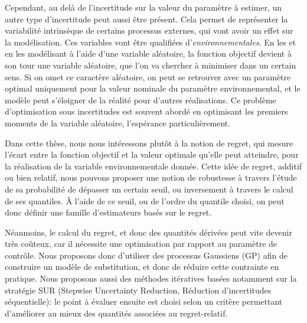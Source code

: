 Cependant, au delà de l'incertitude sur la valeur du paramètre à
estimer, un autre type d'incertitude peut aussi être présent. Cela
permet de représenter la variabilité intrinsèque de certains processus
externes, qui vont avoir un effet sur la modélisation. Ces variables
vont être qualifiées d'\emph{environnementales}. En les et en les
modélisant à l'aide d'une variable aléatoire, la fonction objectif
devient à son tour une variable aléatoire, que l'on va chercher à
minimiser dans un certain sens. Si on omet ce caractère aléatoire, on
peut se retrouver avec un paramètre optimal uniquement pour la valeur
nominale du paramètre environnemental, et le modèle peut s'éloigner de
la réalité pour d'autres réalisations. Ce problème d'optimisation sous
incertitudes est souvent abordé en optimisant les premiers moments de
la variable aléatoire, l'espérance particulièrement.

Dans cette thèse, nous nous intéressons plutôt à la notion de regret,
qui mesure l'écart entre la fonction objectif et la valeur optimale
qu'elle peut atteindre, pour la réalisation de la variable
environnementale donnée. Cette idée de regret, additif ou bien
relatif, nous pouvons proposer une notion de robustesse à travers
l'étude de sa probabilité de dépasser un certain seuil, ou inversement
à travers le calcul de ses quantiles. À l'aide de ce seuil, ou de
l'ordre du quantile choisi, on peut donc définir une famille
d'estimateurs basés sur le regret.

Néanmoins, le calcul du regret, et donc des quantités dérivées peut
vite devenir très coûteux, car il nécessite une optimisation par
rapport au paramètre de contrôle. Nous proposons donc d'utiliser des
processus Gaussiens (GP) afin de construire un modèle de substitution,
et donc de réduire cette contrainte en pratique. Nous proposons aussi
des méthodes itératives basées notamment sur la stratégie SUR
(Stepwise Uncertainty Reduction, Réduction d'incertitudes
séquentielle): le point à évaluer ensuite est choisi selon un critère
permettant d'améliorer au mieux des quantités associées au
regret-relatif.

